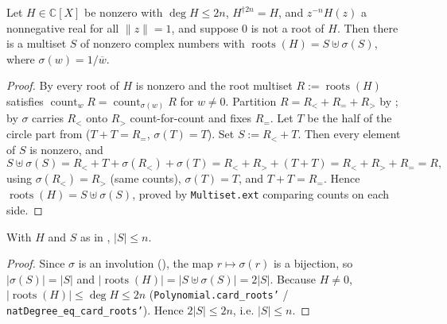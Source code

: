 \begin{lemma}
    \label{lem:fr-build-S}
    \leanok
    Let $H \in \mathbb{C}[X]$ be nonzero with $\deg H \le 2n$,
    $H^{\dagger 2n} = H$, and $z^{-n}H(z)$ a nonnegative real for all
    $\|z\| = 1$, and suppose $0$ is not a root of $H$. Then there is a multiset
    $S$ of nonzero complex numbers with
    $\operatorname{roots}(H) = S \uplus \sigma(S)$, where
    $\sigma(w) = 1/\overline{w}$.
\end{lemma}
\begin{proof}
    By  every root of $H$ is nonzero and the
    root multiset $R := \operatorname{roots}(H)$ satisfies
    $\operatorname{count}_w R = \operatorname{count}_{\sigma(w)} R$ for $w \neq 0$.
    Partition $R = R_{<} + R_{=} + R_{>}$ by ; by
     $\sigma$ carries $R_{<}$ onto $R_{>}$
    count-for-count and fixes $R_{=}$. Let $T$ be the half of the circle part from
     ($T + T = R_{=}$, $\sigma(T) = T$). Set
    $S := R_{<} + T$. Then every element of $S$ is nonzero, and
    \[
        S \uplus \sigma(S) = R_{<} + T + \sigma(R_{<}) + \sigma(T)
        = R_{<} + R_{>} + (T + T) = R_{<} + R_{>} + R_{=} = R,
    \]
    using $\sigma(R_{<}) = R_{>}$ (same counts), $\sigma(T) = T$, and
    $T + T = R_{=}$. Hence $\operatorname{roots}(H) = S \uplus \sigma(S)$, proved
    by \texttt{Multiset.ext} comparing counts on each side.
\end{proof}

\begin{lemma}
    \label{lem:fr-size-bound}
    \leanok
    With $H$ and $S$ as in , $|S| \le n$.
\end{lemma}
\begin{proof}
    Since $\sigma$ is an involution (), the map
    $r \mapsto \sigma(r)$ is a bijection, so $|\sigma(S)| = |S|$ and
    $|\operatorname{roots}(H)| = |S \uplus \sigma(S)| = 2|S|$. Because $H \neq 0$,
    $|\operatorname{roots}(H)| \le \deg H \le 2n$
    (\texttt{Polynomial.card\_roots'} / \texttt{natDegree\_eq\_card\_roots'}).
    Hence $2|S| \le 2n$, i.e. $|S| \le n$.
\end{proof}

